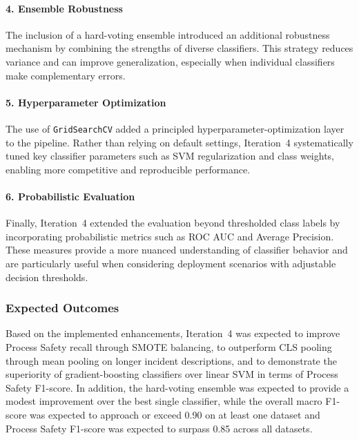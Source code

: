 \documentclass[11pt, titlepage, bibliography=totoc]{scrreprt}
\begin{document}
\paragraph{4. Ensemble Robustness}
The inclusion of a hard-voting ensemble introduced an additional robustness mechanism by combining the strengths of diverse classifiers. This strategy reduces variance and can improve generalization, especially when individual classifiers make complementary errors.

\paragraph{5. Hyperparameter Optimization}
The use of \texttt{GridSearchCV} added a principled hyperparameter-optimization layer to the pipeline. Rather than relying on default settings, Iteration~4 systematically tuned key classifier parameters such as SVM regularization and class weights, enabling more competitive and reproducible performance.

\paragraph{6. Probabilistic Evaluation}
Finally, Iteration~4 extended the evaluation beyond thresholded class labels by incorporating probabilistic metrics such as ROC AUC and Average Precision. These measures provide a more nuanced understanding of classifier behavior and are particularly useful when considering deployment scenarios with adjustable decision thresholds.

\subsubsection{Expected Outcomes}
Based on the implemented enhancements, Iteration~4 was expected to improve Process Safety recall through SMOTE balancing, to outperform CLS pooling through mean pooling on longer incident descriptions, and to demonstrate the superiority of gradient-boosting classifiers over linear SVM in terms of Process Safety F1-score. In addition, the hard-voting ensemble was expected to provide a modest improvement over the best single classifier, while the overall macro F1-score was expected to approach or exceed 0.90 on at least one dataset and Process Safety F1-score was expected to surpass 0.85 across all datasets.
\end{document}
